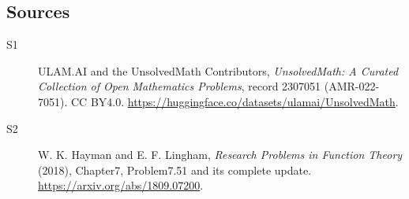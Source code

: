 \documentclass[11pt]{article}
\begin{document}
\subsection{Sources}
\begin{description}
\item[\hypertarget{source:2307051:1}{S1}] ULAM.AI and the UnsolvedMath Contributors, \emph{UnsolvedMath: A Curated Collection of Open Mathematics Problems}, record 2307051 (AMR-022-7051). CC BY4.0. \url{https://huggingface.co/datasets/ulamai/UnsolvedMath}.
\item[\hypertarget{source:2307051:2}{S2}] W. K. Hayman and E. F. Lingham, \emph{Research Problems in Function Theory} (2018), Chapter7, Problem7.51 and its complete update. \url{https://arxiv.org/abs/1809.07200}.
\end{description}
\label{end:2307051}
\end{document}
